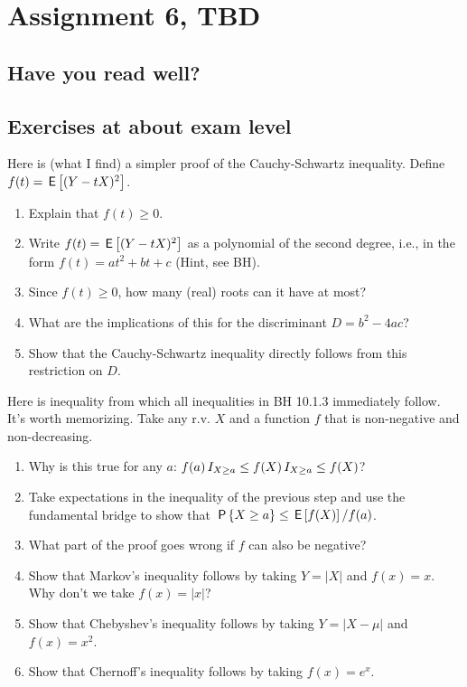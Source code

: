 \documentclass[assignments]{subfiles}
\begin{document}
\section{Assignment 6, TBD}


\subsection{Have you read well?}

\subsection{Exercises at about exam level}
\label{sec:exercises-at-about-1}



\begin{exercise}
Here is (what I find) a simpler proof of the Cauchy-Schwartz inequality.  Define  $f(t) = \,\mathsf{E}\left[(Y-tX)^2\right]$.
\begin{enumerate}
\item Explain that $f(t)\geq 0$.
\item Write $f(t) = \,\mathsf{E}\left[(Y-tX)^2\right]$ as a polynomial of the second degree, i.e., in the form $f(t) = a t^2 + b t + c$ (Hint, see BH).
\item Since $f(t) \geq 0$, how many (real) roots can it have at most?
\item What are the implications of this for the discriminant $D=b^2-4ac$?
\item Show that the Cauchy-Schwartz inequality directly follows from this restriction on $D$.
\end{enumerate}
\end{exercise}

\begin{exercise}
Here is inequality from which all inequalities in BH 10.1.3 immediately follow. It's worth memorizing.
Take any r.v. $X$ and a function $f$ that is non-negative and non-decreasing.
\begin{enumerate}
\item Why is this true for any $a$: $f(a) \,I_{X\geq a} \leq f(X) \,I_{X\geq a} \leq f(X)$?
\item Take expectations in the inequality of the previous step and use the fundamental bridge to show that $\,\mathsf{P}\left\{X\geq a\right\} \leq \,\mathsf{E}\left[f(X)\right]/f(a)$.
\item What part of the proof goes wrong if  $f$ can also be negative?
\item Show that Markov's inequality follows by taking $Y=|X|$ and  $f(x)=x$. Why don't we take $f(x) = |x|$?
\item Show that Chebyshev's inequality follows by taking $Y=|X-\mu|$ and $f(x)=x^2$.
\item Show that Chernoff's inequality follows by taking $f(x)=e^{x}$.
\end{enumerate}
\end{exercise}
\end{document}
